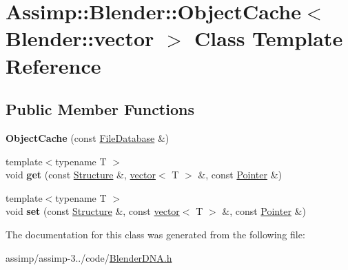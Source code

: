 \hypertarget{class_assimp_1_1_blender_1_1_object_cache_3_01_blender_1_1vector_01_4}{\section{Assimp\+:\+:Blender\+:\+:Object\+Cache$<$ Blender\+:\+:vector $>$ Class Template Reference}
\label{class_assimp_1_1_blender_1_1_object_cache_3_01_blender_1_1vector_01_4}
}
\subsection*{Public Member Functions}
\begin{DoxyCompactItemize}
\item 
\hypertarget{class_assimp_1_1_blender_1_1_object_cache_3_01_blender_1_1vector_01_4_a79340e4b8b1db94f8b745b453adf1553}{{\bfseries Object\+Cache} (const \hyperlink{class_assimp_1_1_blender_1_1_file_database}{File\+Database} \&)}\label{class_assimp_1_1_blender_1_1_object_cache_3_01_blender_1_1vector_01_4_a79340e4b8b1db94f8b745b453adf1553}

\item 
\hypertarget{class_assimp_1_1_blender_1_1_object_cache_3_01_blender_1_1vector_01_4_a5eb46d664c4f2471d1d454cf288f9b6a}{{\footnotesize template$<$typename T $>$ }\\void {\bfseries get} (const \hyperlink{class_assimp_1_1_blender_1_1_structure}{Structure} \&, \hyperlink{class_assimp_1_1_blender_1_1vector}{vector}$<$ T $>$ \&, const \hyperlink{struct_assimp_1_1_blender_1_1_pointer}{Pointer} \&)}\label{class_assimp_1_1_blender_1_1_object_cache_3_01_blender_1_1vector_01_4_a5eb46d664c4f2471d1d454cf288f9b6a}

\item 
\hypertarget{class_assimp_1_1_blender_1_1_object_cache_3_01_blender_1_1vector_01_4_ac8f6e3eeb0789835937c1134044f8f6a}{{\footnotesize template$<$typename T $>$ }\\void {\bfseries set} (const \hyperlink{class_assimp_1_1_blender_1_1_structure}{Structure} \&, const \hyperlink{class_assimp_1_1_blender_1_1vector}{vector}$<$ T $>$ \&, const \hyperlink{struct_assimp_1_1_blender_1_1_pointer}{Pointer} \&)}\label{class_assimp_1_1_blender_1_1_object_cache_3_01_blender_1_1vector_01_4_ac8f6e3eeb0789835937c1134044f8f6a}

\end{DoxyCompactItemize}


The documentation for this class was generated from the following file\+:\begin{DoxyCompactItemize}
\item 
assimp/assimp-\/3../code/\hyperlink{_blender_d_n_a_8h}{Blender\+D\+N\+A.\+h}\end{DoxyCompactItemize}
